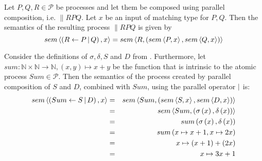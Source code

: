 \begin{definition}
\label{def:sem_parallel}
Let $P, Q, R \in \mathcal{P}$ be processes and let them be composed using parallel composition, i.e. $\parallel{R}{P}{Q}$. Let $x$ be an input of matching type for $P, Q$. Then the semantics of the resulting process $\parallel{R}{P}{Q}$ is given by %
  \begin{equation}
    \label{eqn:sem_parallel}
    sem \left\langle \left( R \gets P \, | \, Q \right), x \right\rangle = sem \left\langle R, \left( sem \left\langle P, x \right\rangle, sem \left\langle Q, x \right\rangle \right) \right\rangle
  \end{equation}
  \hfill\qedsymbol
\end{definition}


\begin{example}
\label{exp:sem_parallel}
Consider the definitions of $\sigma, \delta, S$ and $D$ from . Furthermore, let $sum \colon \mathbb{N} \times \mathbb{N} \to \mathbb{N}, \left( x, y \right) \mapsto x + y$ be the function that is intrinsic to the atomic process $Sum \in \mathcal{P}$. Then the semantics of the process created by parallel composition of $S$ and $D$, combined with $Sum$, using the parallel operator $|$ is: 
  \begin{eqnarray*}
    sem \left\langle \left( Sum \gets S \, | \, D \right), x \right\rangle & = & sem \left\langle Sum, \left( sem \left\langle S, x \right\rangle, sem \left\langle D, x \right\rangle \right) \right\rangle \\
                                  & = & sem \left\langle Sum, \left( \sigma\left(x\right), \delta\left(x\right) \right) \right\rangle \\
                                  & = & sum \left( \sigma\left(x\right), \delta\left(x\right) \right) \\
                                  & = & sum \left( x \mapsto x+1, x \mapsto 2x \right) \\
                                  & = & x \mapsto \left( x+1 \right) + \left( 2x \right) \\
                                  & = & x \mapsto 3x + 1
  \end{eqnarray*}
  \hfill\qedsymbol
\end{example}

